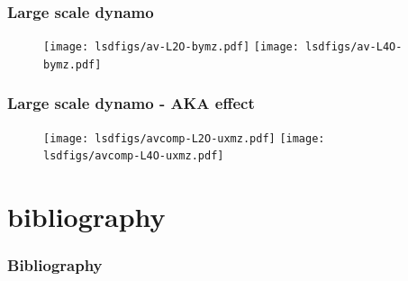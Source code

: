\documentclass{beamer}
\begin{document}
    \begin{frame}
      \frametitle{Large scale dynamo}
\begin{figure}
\texttt{[image: lsdfigs/av-L2O-bymz.pdf]}
\texttt{[image: lsdfigs/av-L4O-bymz.pdf]}
\end{figure}
    \end{frame}
    \begin{frame}
      \frametitle{Large scale dynamo - AKA effect}
\begin{figure}
\texttt{[image: lsdfigs/avcomp-L2O-uxmz.pdf]}
\texttt{[image: lsdfigs/avcomp-L4O-uxmz.pdf]}
\end{figure}
    \end{frame}
  \section{bibliography}
    \begin{frame}[allowframebreaks]
      \frametitle{Bibliography}
      {\footnotesize{
      {\textcolor{mymidblue}{
      }}}}
  \end{frame}
  
\end{document}
